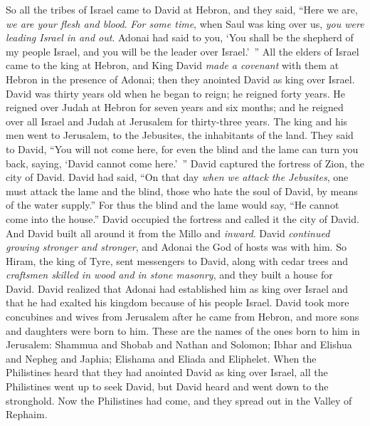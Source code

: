 \begin{biblechapter} %
 So all the tribes of Israel came to David at Hebron, and they said, “Here we are, \textit{we are your flesh and blood}.
\verse \textit{For some time}, when Saul was king over us, \textit{you were leading Israel in and out}. Adonai had said to you, ‘You shall be the shepherd of my people Israel, and you will be the leader over Israel.’ ”
\verse All the elders of Israel came to the king at Hebron, and King David \textit{made a covenant} with them at Hebron in the presence of Adonai; then they anointed David as king over Israel.
\verse David was thirty years old when he began to reign; he reigned forty years.
\verse He reigned over Judah at Hebron for seven years and six months; and he reigned over all Israel and Judah at Jerusalem for thirty-three years.
 The king and his men went to Jerusalem, to the Jebusites, the inhabitants of the land. They said to David, “You will not come here, for even the blind and the lame can turn you back, saying, ‘David cannot come here.’ ”
\verse David captured the fortress of Zion, the city of David.
\verse David had said, “On that day \textit{when we attack the Jebusites}, one must attack the lame and the blind, those who hate the soul of David, by means of the water supply.” For thus the blind and the lame would say, “He cannot come into the house.”
\verse David occupied the fortress and called it the city of David. And David built all around it from the Millo and \textit{inward}.
\verse David \textit{continued growing stronger and stronger}, and Adonai the God of hosts was with him.
\verse So Hiram, the king of Tyre, sent messengers to David, along with cedar trees and \textit{craftsmen skilled in wood and in stone masonry}, and they built a house for David.
\verse David realized that Adonai had established him as king over Israel and that he had exalted his kingdom because of his people Israel.
\verse David took more concubines and wives from Jerusalem after he came from Hebron, and more sons and daughters were born to him.
\verse These are the names of the ones born to him in Jerusalem: Shammua and Shobab and Nathan and Solomon;
\verse Ibhar and Elishua and Nepheg and Japhia;
\verse Elishama and Eliada and Eliphelet.
 When the Philistines heard that they had anointed David as king over Israel, all the Philistines went up to seek David, but David heard and went down to the stronghold.
\verse Now the Philistines had come, and they spread out in the Valley of Rephaim.

\end{biblechapter}

